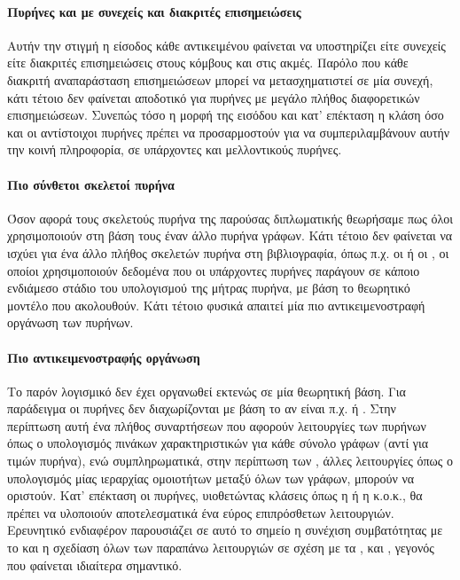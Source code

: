 \paragraph*{Πυρήνες και με συνεχείς και διακριτές επισημειώσεις}
Αυτήν την στιγμή η είσοδος κάθε αντικειμένου φαίνεται να υποστηρίζει είτε συνεχείς είτε διακριτές επισημειώσεις στους κόμβους και στις ακμές.
Παρόλο που κάθε διακριτή αναπαράσταση επισημειώσεων μπορεί να μετασχηματιστεί σε μία συνεχή, κάτι τέτοιο δεν φαίνεται αποδοτικό για πυρήνες με μεγάλο πλήθος διαφορετικών επισημειώσεων.
Συνεπώς τόσο η μορφή της εισόδου και κατ' επέκταση η κλάση  όσο και οι αντίστοιχοι πυρήνες πρέπει να προσαρμοστούν για να συμπεριλαμβάνουν αυτήν την κοινή πληροφορία, σε υπάρχοντες και μελλοντικούς πυρήνες.
\paragraph*{Πιο σύνθετοι σκελετοί πυρήνα}
Όσον αφορά τους σκελετούς πυρήνα της παρούσας διπλωματικής θεωρήσαμε πως όλοι χρησιμοποιούν στη βάση τους έναν άλλο πυρήνα γράφων.
Κάτι τέτοιο δεν φαίνεται να ισχύει για ένα άλλο πλήθος σκελετών πυρήνα στη βιβλιογραφία, όπως π.χ. οι  \cite{DGK_PINAR} ή οι  \cite{kriege_2016_otk}, οι οποίοι χρησιμοποιούν δεδομένα που οι υπάρχοντες πυρήνες παράγουν σε κάποιο ενδιάμεσο στάδιο του υπολογισμού της μήτρας πυρήνα, με βάση το θεωρητικό μοντέλο που ακολουθούν.
Κάτι τέτοιο φυσικά απαιτεί μία πιο αντικειμενοστραφή οργάνωση των πυρήνων.
\paragraph*{Πιο αντικειμενοστραφής οργάνωση}
Το παρόν λογισμικό δεν έχει οργανωθεί εκτενώς σε μία θεωρητική βάση.
Για παράδειγμα οι πυρήνες δεν διαχωρίζονται με βάση το αν είναι π.χ.  \cite{vishwanathan2010graph} ή  \cite{Frohlich2005}.
Στην περίπτωση αυτή ένα πλήθος συναρτήσεων που αφορούν λειτουργίες των  πυρήνων όπως ο υπολογισμός πινάκων χαρακτηριστικών για κάθε σύνολο γράφων (αντί για τιμών πυρήνα), ενώ συμπληρωματικά, στην περίπτωση των , άλλες λειτουργίες όπως ο υπολογισμός μίας ιεραρχίας ομοιοτήτων μεταξύ όλων των γράφων, μπορούν να οριστούν.
Κατ' επέκταση οι πυρήνες, υιοθετώντας κλάσεις όπως η  ή η  κ.ο.κ., θα πρέπει να υλοποιούν αποτελεσματικά ένα εύρος επιπρόσθετων λειτουργιών.
Ερευνητικό ενδιαφέρον παρουσιάζει σε αυτό το σημείο η συνέχιση συμβατότητας με το  και η σχεδίαση όλων των παραπάνω λειτουργιών σε σχέση με τα ,  και , γεγονός που φαίνεται ιδιαίτερα σημαντικό.
